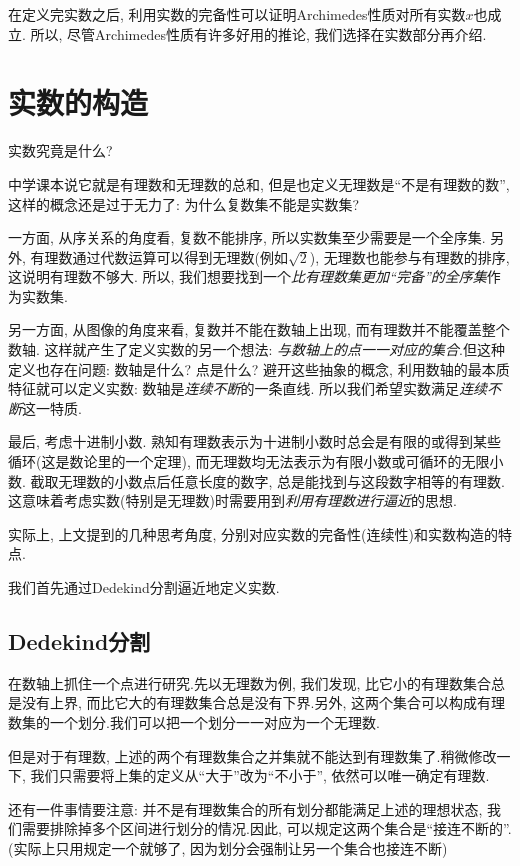 在定义完实数之后, 利用实数的完备性可以证明Archimedes性质对所有实数$x$也成立. 所以, 尽管Archimedes性质有许多好用的推论, 我们选择在实数部分再介绍. 

\newpage
\section{实数的构造}

实数究竟是什么? 

中学课本说它就是有理数和无理数的总和, 但是也定义无理数是“不是有理数的数”, 这样的概念还是过于无力了: 为什么复数集不能是实数集? 

一方面, 从序关系的角度看, 复数不能排序, 所以实数集至少需要是一个全序集. 另外, 有理数通过代数运算可以得到无理数(例如$\sqrt{2}$), 无理数也能参与有理数的排序, 这说明有理数不够大. 所以, 我们想要找到一个\textit{比有理数集更加“完备”的全序集}作为实数集. 

另一方面, 从图像的角度来看, 复数并不能在数轴上出现, 而有理数并不能覆盖整个数轴. 这样就产生了定义实数的另一个想法: \textit{与数轴上的点一一对应的集合}.但这种定义也存在问题: 数轴是什么? 点是什么? 避开这些抽象的概念, 利用数轴的最本质特征就可以定义实数: 数轴是\textit{连续不断}的一条直线. 所以我们希望实数满足\textit{连续不断}这一特质. 

最后, 考虑十进制小数. 熟知有理数表示为十进制小数时总会是有限的或得到某些循环(这是数论里的一个定理), 而无理数均无法表示为有限小数或可循环的无限小数. 截取无理数的小数点后任意长度的数字, 总是能找到与这段数字相等的有理数. 这意味着考虑实数(特别是无理数)时需要用到\textit{利用有理数进行逼近}的思想. 

实际上, 上文提到的几种思考角度, 分别对应实数的完备性(连续性)和实数构造的特点.

我们首先通过Dedekind分割逼近地定义实数.

\subsection{Dedekind分割}

在数轴上抓住一个点进行研究.先以无理数为例, 我们发现, 比它小的有理数集合总是没有上界, 而比它大的有理数集合总是没有下界.另外, 这两个集合可以构成有理数集的一个划分.我们可以把一个划分一一对应为一个无理数.

但是对于有理数, 上述的两个有理数集合之并集就不能达到有理数集了.稍微修改一下, 我们只需要将上集的定义从“大于”改为“不小于”, 依然可以唯一确定有理数.

还有一件事情要注意: 并不是有理数集合的所有划分都能满足上述的理想状态, 我们需要排除掉多个区间进行划分的情况.因此, 可以规定这两个集合是“接连不断的”. (实际上只用规定一个就够了, 因为划分会强制让另一个集合也接连不断)

